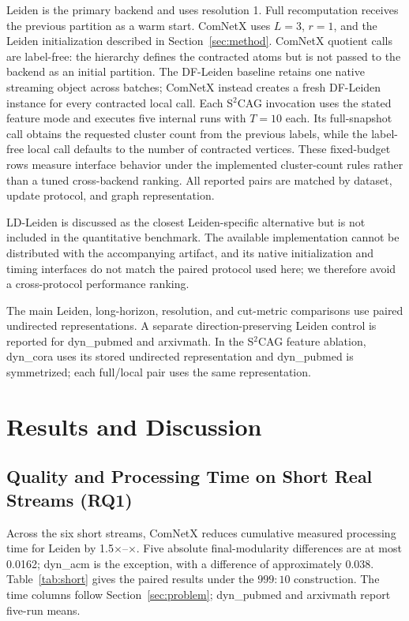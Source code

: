 \documentclass{ieeeaccess}
\begin{document}
Leiden is the primary backend and uses resolution 1. Full recomputation receives
the previous partition as a warm start. ComNetX uses $L=3$, $r=1$, and the
Leiden initialization described in Section~\ref{sec:method}. ComNetX quotient
calls are label-free: the hierarchy defines the contracted atoms but is not
passed to the backend as an initial partition. The DF-Leiden baseline
retains one native streaming object across batches; ComNetX instead creates a
fresh DF-Leiden instance for every contracted local call. Each S$^2$CAG
invocation uses the stated feature mode and executes five internal runs with
$T=10$ each. Its full-snapshot call obtains the requested cluster count from the
previous labels, while the label-free local call defaults to the number of
contracted vertices. These fixed-budget rows measure interface behavior under
the implemented cluster-count rules rather than a tuned cross-backend ranking.
All reported pairs are matched by dataset, update protocol, and graph
representation.

LD-Leiden is discussed as the closest Leiden-specific alternative but is not
included in the quantitative benchmark. The available implementation cannot be
distributed with the accompanying artifact, and its native initialization and
timing interfaces do not match the paired protocol used here; we therefore
avoid a cross-protocol performance ranking.

The main Leiden, long-horizon, resolution, and cut-metric comparisons use
paired undirected representations. A separate direction-preserving Leiden
control is reported for dyn\_pubmed and arxivmath. In the S$^2$CAG feature
ablation, dyn\_cora uses its stored undirected representation and dyn\_pubmed
is symmetrized; each full/local pair uses the same representation.

\section{Results and Discussion}
\label{sec:results}

\subsection{Quality and Processing Time on Short Real Streams (RQ1)}

Across the six short streams, ComNetX reduces cumulative measured processing time for Leiden
by 1.5$\times$--\ArxivShortSpeedup$\times$. Five absolute final-modularity differences
are at most 0.0162; dyn\_acm is the exception, with a difference of
approximately 0.038. Table~\ref{tab:short} gives the paired results under the
$999{:}10$ construction. The time columns follow Section~\ref{sec:problem};
dyn\_pubmed and arxivmath report five-run means.
\end{document}
